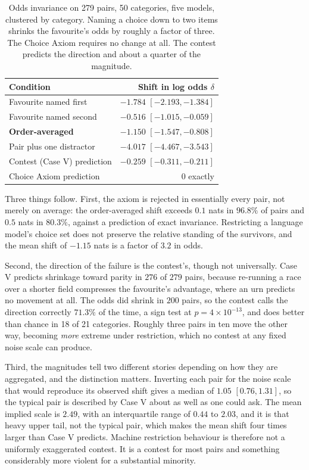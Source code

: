 \documentclass[11pt]{article}
\begin{document}
\begin{table}[ht]
\centering
\small
\begin{tabular}{lr}
\toprule
Condition & Shift in log odds $\delta$ \\
\midrule
Favourite named first & $-1.784$ $[-2.193, -1.384]$ \\
Favourite named second & $-0.516$ $[-1.015, -0.059]$ \\
\textbf{Order-averaged} & $\mathbf{-1.150}$ $\mathbf{[-1.547, -0.808]}$ \\
Pair plus one distractor & $-4.017$ $[-4.467, -3.543]$ \\
\midrule
Contest (Case V) prediction & $-0.259$ $[-0.311, -0.211]$ \\
Choice Axiom prediction & $0$ exactly \\
\bottomrule
\end{tabular}
\caption{Odds invariance on 279 pairs, 50 categories, five models, clustered by
category. Naming a choice down to two items shrinks the favourite's odds by
roughly a factor of three. The Choice Axiom requires no change at all. The
contest predicts the direction and about a quarter of the magnitude.}
\label{tab:odds}
\end{table}

Three things follow. First, the axiom is rejected in essentially every pair, not
merely on average: the order-averaged shift exceeds $0.1$ nats in $96.8\%$ of
pairs and $0.5$ nats in $80.3\%$, against a prediction of exact invariance.
Restricting a language model's choice set does not preserve the relative standing
of the survivors, and the mean shift of $-1.15$ nats is a factor of $3.2$ in
odds.

Second, the direction of the failure is the contest's, though not universally.
Case V predicts shrinkage toward parity in $276$ of $279$ pairs, because
re-running a race over a shorter field compresses the favourite's advantage,
where an urn predicts no movement at all. The odds did shrink in $200$ pairs, so
the contest calls the direction correctly $71.3\%$ of the time, a sign test at
$p = 4 \times 10^{-13}$, and does better than chance in 18 of 21 categories.
Roughly three pairs in ten move the other way, becoming \emph{more} extreme under
restriction, which no contest at any fixed noise scale can produce.

Third, the magnitudes tell two different stories depending on how they are
aggregated, and the distinction matters. Inverting each pair for the noise scale
that would reproduce its observed shift gives a median of $1.05$
$[0.76, 1.31]$, so the typical pair is described by Case V about as well as one
could ask. The mean implied scale is $2.49$, with an interquartile range of
$0.44$ to $2.03$, and it is that heavy upper tail, not the typical pair, which
makes the mean shift four times larger than Case V predicts. Machine restriction
behaviour is therefore not a uniformly exaggerated contest. It is a contest for
most pairs and something considerably more violent for a substantial minority.
\end{document}
